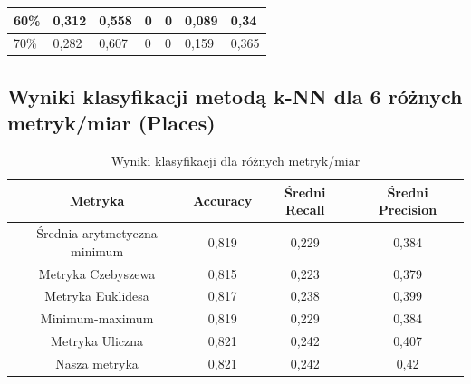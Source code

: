 \documentclass{classrep}
\begin{document}
{\begin{table}[H]
\begin{center}
\begin{tabular}{|l|l|l|l|l|l|l|}
60\%                                                              & 0,312                                                        & 0,558                                                            & 0                                                                 & 0                                                                    & 0,089                                                            & 0,34                     \\ \hline
70\%                                                              & 0,282                                                        & 0,607                                                            & 0                                                                 & 0                                                                    & 0,159                                                            & 0,365                    \\ \hline
\end{tabular}
\end{center}
\end{table}

\subsection{Wyniki klasyfikacji metodą k-NN dla 6 różnych metryk/miar (Places)}

\begin{table}[H]
\begin{center}
\caption{Wyniki klasyfikacji dla różnych metryk/miar}
\begin{tabular}{|c|c|c|c|}
\hline
\textbf{Metryka}             & \textbf{Accuracy} & \textbf{Średni Recall} & \textbf{Średni Precision} \\ \hline
Średnia arytmetyczna minimum & 0,819             & 0,229                  & 0,384                     \\ \hline
Metryka Czebyszewa           & 0,815             & 0,223                  & 0,379                     \\ \hline
Metryka Euklidesa            & 0,817             & 0,238                  & 0,399                     \\ \hline
Minimum-maximum              & 0,819             & 0,229                  & 0,384                     \\ \hline
Metryka Uliczna              & 0,821             & 0,242                  & 0,407                     \\ \hline
Nasza metryka                & 0,821             & 0,242                  & 0,42                      \\ \hline
\end{tabular}
\end{center}
\end{table}

}
\end{document}
